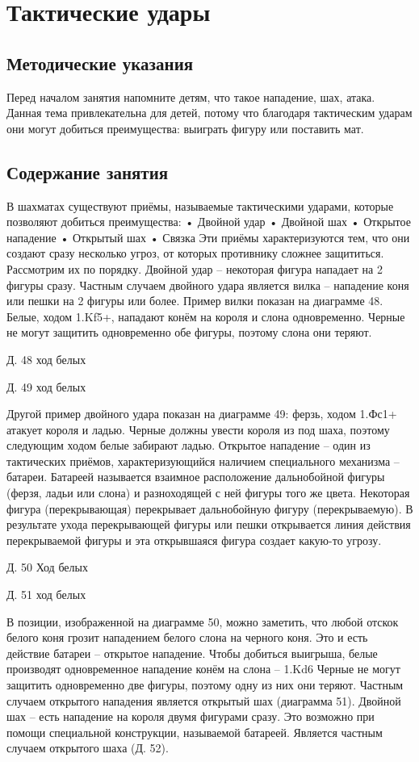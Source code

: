 \chapter{Тактические удары}

\section{Методические указания}

Перед началом занятия напомните детям, что такое нападение, шах, атака. Данная тема привлекательна для детей, потому что благодаря тактическим ударам они могут добиться преимущества: выиграть фигуру или поставить мат.

\section{Содержание занятия}

В шахматах существуют приёмы, называемые тактическими ударами, которые позволяют добиться преимущества:
•	Двойной удар
•	Двойной шах
•	Открытое нападение
•	Открытый шах
•	Связка
Эти приёмы характеризуются тем, что они создают сразу несколько угроз, от которых противнику сложнее защититься. Рассмотрим их по порядку.
Двойной удар – некоторая фигура нападает на 2 фигуры сразу. Частным случаем двойного удара является вилка – нападение коня или пешки на 2 фигуры или более. Пример вилки показан на диаграмме 48. Белые, ходом 1.Kf5+, нападают конём на короля и слона одновременно. Черные не могут защитить одновременно обе фигуры, поэтому слона они теряют.
 
 
Д. 48 ход белых
 
Д. 49 ход белых
 
Другой пример двойного удара показан на диаграмме 49: ферзь, ходом 1.Фс1+ атакует короля и ладью. Черные должны увести короля из под шаха, поэтому следующим ходом белые забирают ладью.
Открытое нападение – один из тактических приёмов, характеризующийся наличием специального механизма – батареи. Батареей называется взаимное расположение дальнобойной фигуры (ферзя, ладьи или слона) и разноходящей с ней фигуры того же цвета. Некоторая фигура (перекрывающая) перекрывает дальнобойную фигуру (перекрываемую). В результате ухода перекрывающей фигуры или пешки открывается линия действия перекрываемой фигуры и эта открывшаяся фигура создает какую-то угрозу.
 
 
Д. 50 Ход белых
 
Д. 51 ход белых
 
В позиции, изображенной на диаграмме 50, можно заметить, что любой отскок белого коня грозит нападением белого слона на черного коня. Это и есть действие батареи – открытое нападение. Чтобы добиться выигрыша, белые производят одновременное нападение конём на слона – 1.Kd6 Черные не могут защитить одновременно две фигуры, поэтому одну из них они теряют.
Частным случаем открытого нападения является открытый шах (диаграмма 51).
Двойной шах – есть нападение на короля двумя фигурами сразу. Это возможно при помощи специальной конструкции, называемой батареей. Является частным случаем открытого шаха (Д. 52).
 
